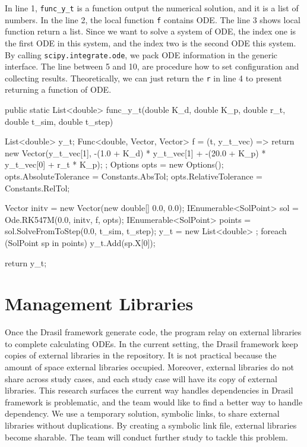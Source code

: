In line 1, \verb|func_y_t| is a function output the numerical solution, and it is a list of numbers. In the line 2, the local function \verb|f| contains ODE. The line 3 shows local function return a list. Since we want to solve a system of ODE, the index one is the first ODE in this system, and the index two is the second ODE this system. By calling \verb|scipy.integrate.ode|, we pack ODE information in the generic interface. The line between 5 and 10, are procedure how to set configuration and collecting results. Theoretically, we can just return the \verb|r| in line 4 to present returning a function of ODE.

\begin{listing}[ht]
\begin{csharp1}
public static List<double> func_y_t(double K_d, double K_p, double r_t, double t_sim, double t_step) {
    List<double> y_t;
    Func<double, Vector, Vector> f = (t, y_t_vec) => {
        return new Vector(y_t_vec[1], -(1.0 + K_d) * y_t_vec[1] + -(20.0 + K_p) * y_t_vec[0] + r_t * K_p);
    };
    Options opts = new Options();
    opts.AbsoluteTolerance = Constants.AbsTol;
    opts.RelativeTolerance = Constants.RelTol;
    
    Vector initv = new Vector(new double[] {0.0, 0.0});
    IEnumerable<SolPoint> sol = Ode.RK547M(0.0, initv, f, opts);
    IEnumerable<SolPoint> points = sol.SolveFromToStep(0.0, t_sim, t_step);
    y_t = new List<double> {};
    foreach (SolPoint sp in points) {
        y_t.Add(sp.X[0]);
    }
    
    return y_t;
}
\end{csharp1}
\label{code_csharposlo}
\end{listing}

\section{Management Libraries}
Once the Drasil framework generate code, the program relay on external libraries to complete calculating ODEs. In the current setting, the Drasil framework keep copies of external libraries in the repository. It is not practical because the amount of space external libraries occupied. Moreover, external libraries do not share across study cases, and each study case will have its copy of external libraries. This research surfaces the current way handles dependencies in Drasil framework is problematic, and the team would like to find a better way to handle dependency. We use a temporary solution, symbolic links, to share external libraries without duplications. By creating a symbolic link file, external libraries become sharable. The team will conduct further study to tackle this problem.
